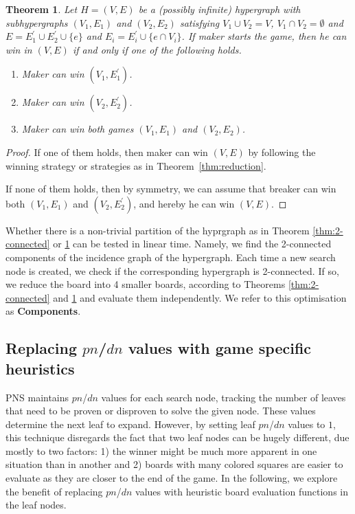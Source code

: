 \documentclass[conference]{IEEEtran}
\newtheorem{theorem}{Theorem}[section]
\theoremstyle{definition}
\newcommand{\pn}{$pn$\xspace}
\newcommand{\dn}{$dn$\xspace}
\begin{document}
\begin{theorem}
\label{thm:2-edge-connected}
Let $H = (V, E)$ be a (possibly infinite) hypergraph with subhypergraphs $(V_1, E_1)$ and $(V_2, E_2)$ satisfying $V_1 \cup V_2 = V$, $V_1 \cap V_2 = \emptyset$ and $E = E_1^{\prime} \cup E_2^{\prime} \cup \{e\}$ and $E_i = E_i^{\prime} \cup \{e \cap V_i\}$. If maker starts the game, then he can win in $(V, E)$ if and only if one of the following holds.
\begin{enumerate}
    \item Maker can win $(V_1, E_1^{\prime})$.
    \item Maker can win $(V_2, E_2^{\prime})$.
    \item Maker can win both games $(V_1, E_1)$ and $(V_2, E_2)$.
\end{enumerate}
\end{theorem}

\begin{proof}
If one of them holds, then maker can win $(V, E)$ by following the winning strategy or strategies as in Theorem~\ref{thm:reduction}.

If none of them holds, then by symmetry, we can assume that breaker can win both $(V_1, E_1)$ and $(V_2, E_2^{\prime})$, and hereby he can win $(V, E)$.
\end{proof}

Whether there is a non-trivial partition of the hyprgraph as in Theorem \ref{thm:2-connected} or \ref{thm:2-edge-connected} can be tested in linear time. Namely, we find the 2-connected components of the incidence graph of the hypergraph.
Each time a new search node is created, we check if the corresponding hypergraph is 2-connected. If so, we reduce the board into 4 smaller boards, according to Theorems \ref{thm:2-connected} and \ref{thm:2-edge-connected} and evaluate them independently. We refer to this optimisation as {\bf Components}.

\subsection{Replacing \pn/\dn values with game specific heuristics} \label{Heuristic_PN_DN}

PNS maintains \pn/\dn values for each search node, tracking the number of leaves that need to be proven or disproven to solve the given node. These values determine the next leaf to expand. However, by setting leaf \pn/\dn values to $1$, this technique disregards the fact that two leaf nodes can be hugely different, due mostly to two factors: 1) the winner might be much more apparent in one situation than in another and 2) boards with many colored squares are easier to evaluate as they are closer to the end of the game. In the following, we explore the benefit of replacing \pn/\dn values with heuristic board evaluation functions in the leaf nodes.
\end{document}
